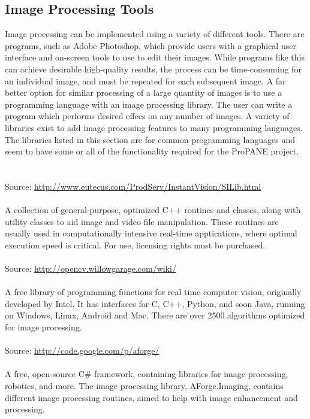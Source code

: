 \documentclass{article}
\begin{document}
\subsection*{Image Processing Tools}

Image processing can be implemented using a variety of different tools.  There are programs, such as Adobe Photoshop, which provide users with a graphical user interface and on-screen tools to use to edit their images.  While programs like this can achieve desirable high-quality results, the process can be time-consuming for an individual image, and must be repeated for each subsequent image.  A far better option for similar processing of a large quantity of images is to use a programming language with an image processing library.  The user can write a program which performs desired effecs on any number of images.  A variety of libraries exist to add image processing features to many programming languages.  The libraries listed in this section are for common programming languages and seem to have some or all of the functionality required for the ProPANE project.  \\ \\ 

 \\
Source: {\color{red} \url{http://www.eutecus.com/ProdServ/InstantVision/SILib.html}} \\ \\
A collection of general-purpose, optimized C++ routines and classes, along with utility classes to aid image and video file manipulation.  These routines are usually used in computationally intensive real-time apptications, where optimal execution speed is critical.  For use, licensing rights must be purchased. \\

 \\
Source: {\color{red} \url{http://opencv.willowgarage.com/wiki/}} \\ \\ 
A free library of programming functions for real time computer vision, originally developed by Intel.  It has interfaces for C, C++, Python, and soon Java, running on Windows, Linux, Android and Mac.  There are over 2500 algorithms optimized for image processing.  \\

 \\
Source: {\color{red} \url{http://code.google.com/p/aforge/}} \\ \\
A free, open-source C\# framework, containing libraries for image processing, robotics, and more.  The image processing library, AForge.Imaging, contains different image processing routines, aimed to help with image enhancement and processing.  \\
\end{document}
